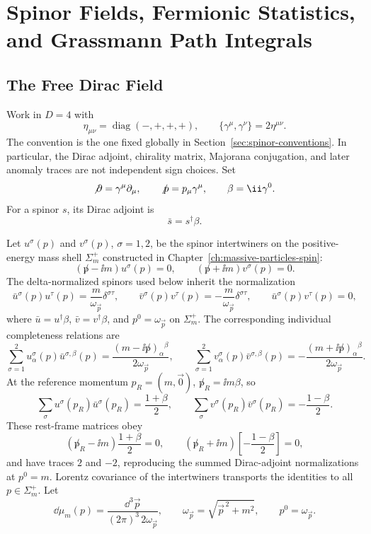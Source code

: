 \chapter{Spinor Fields, Fermionic Statistics, and Grassmann Path Integrals}
\label{ch:spinor-fields-fermionic-path-integrals}
\ConventionsMixed


\section{The Free Dirac Field}

\begin{definition}
\label{def:free-dirac-spinor-intertwiner-data}
Work in \(D=4\) with
\[
  \eta_{\mu\nu}=\operatorname{diag}(-,+,+,+),
  \qquad
  \{\gamma^\mu,\gamma^\nu\}=2\eta^{\mu\nu}.
\]
The convention is the one fixed globally in
Section~\ref{sec:spinor-conventions}.  In particular, the Dirac adjoint,
chirality matrix, Majorana conjugation, and later anomaly traces are not
independent sign choices.
Set
\[
  \not\partial=\gamma^\mu\partial_\mu,
  \qquad
  \not p=p_\mu\gamma^\mu,
  \qquad
  \beta=\ii\gamma^0 .
\]
For a spinor \(s\), its Dirac adjoint is
\[
  \bar s=s^\dagger\beta .
\]

Let \(u^\sigma(p)\) and \(v^\sigma(p)\), \(\sigma=1,2\), be the spinor
intertwiners on the positive-energy mass shell \(\Sigma_m^+\) constructed in
Chapter~\ref{ch:massive-particles-spin}:
\[
  (\not p-\ii m)u^\sigma(p)=0,
  \qquad
  (\not p+\ii m)v^\sigma(p)=0.
\]
The delta-normalized spinors used below inherit the normalization
\[
  \bar u^\sigma(p)u^\tau(p)=\frac{m}{\omega_{\vec p}}\delta^{\sigma\tau},
  \qquad
  \bar v^\sigma(p)v^\tau(p)=-\frac{m}{\omega_{\vec p}}\delta^{\sigma\tau},
  \qquad
  \bar u^\sigma(p)v^\tau(p)=0,
\]
where \(\bar u=u^\dagger\beta\), \(\bar v=v^\dagger\beta\), and
\(p^0=\omega_{\vec p}\) on \(\Sigma_m^+\).
The corresponding individual completeness relations are
\begin{equation}
  \sum_{\sigma=1}^2
  u_\alpha^\sigma(p)\bar u^{\sigma,\beta}(p)
  =
  \frac{(m-\ii\not p)_\alpha{}^\beta}{2\omega_{\vec p}},
  \qquad
  \sum_{\sigma=1}^2
  v_\alpha^\sigma(p)\bar v^{\sigma,\beta}(p)
  =
  -\frac{(m+\ii\not p)_\alpha{}^\beta}{2\omega_{\vec p}} .
  \label{eq:dirac-individual-spin-sums}
\end{equation}
At the reference momentum \(p_R=(m,\vec0)\), \(\not p_R=\ii m\beta\), so
\[
  \sum_\sigma u^\sigma(p_R)\bar u^\sigma(p_R)
  =
  \frac{1+\beta}{2},
  \qquad
  \sum_\sigma v^\sigma(p_R)\bar v^\sigma(p_R)
  =
  -\frac{1-\beta}{2}.
\]
These rest-frame matrices obey
\[
  (\not p_R-\ii m)\frac{1+\beta}{2}=0,
  \qquad
  (\not p_R+\ii m)\left[-\frac{1-\beta}{2}\right]=0,
\]
and have traces \(2\) and \(-2\), reproducing the summed Dirac-adjoint
normalizations at \(p^0=m\).  Lorentz covariance of the intertwiners transports
the identities to all \(p\in\Sigma_m^+\).
Let
\[
  \dd\mu_m(p)
  =
  \frac{\dd^3\vec p}{(2\pi)^3\,2\omega_{\vec p}},
  \qquad
  \omega_{\vec p}=\sqrt{\vec p^{\,2}+m^2},
  \qquad
  p^0=\omega_{\vec p}.
\]
\end{definition}

